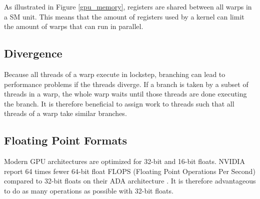 As illustrated in Figure \ref{gpu_memory}, registers are shared between all warps in a SM unit. This means that the amount of registers used by a kernel can limit the amount of warps that can run in parallel.

\subsection{Divergence}
Because all threads of a warp execute in lockstep, branching can lead to performance problems if the threads diverge. If a branch is taken by a subset of threads in a warp, the whole warp waits until those threads are done executing the branch. It is therefore beneficial to assign work to threads such that all threads of a warp take similar branches.

\subsection{Floating Point Formats}\label{float_speed}
Modern GPU architectures are optimized for 32-bit and 16-bit floats. NVIDIA report 64 times fewer 64-bit float FLOPS (Floating Point Operations Per Second) compared to 32-bit floats on their ADA architecture \citep{nvidiaadaarch}.
It is therefore advantageous to do as many operations as possible with 32-bit floats.
